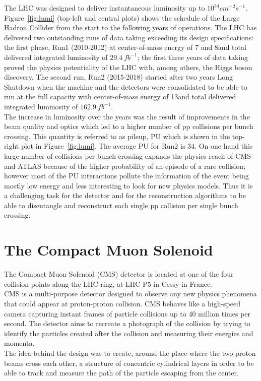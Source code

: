 The LHC was designed to deliver instantaneous luminosity up to $10^{34}cm^{-2}s^{-1}$.\\
Figure~\ref{fig:lumi} (top-left and central
plots) shows the schedule of the Large Hadron Collider from the start
to the following years of operations. The LHC has delivered two
outstanding runs of data taking exceeding its design specifications: the first phase, Run1 (2010-2012) at
center-of-mass energy of 7 and 8\TeV and total delivered integrated
luminosity of $29.4\ fb^{-1}$; the first three years of data taking proved
the physics potentiality of the LHC with, among others, the Higgs boson
discovery. The second run, Run2 (2015-2018) started after two years Long
Shutdown when the machine and the detectors were 
consolidated to be able to run at the full capacity with 
center-of-mass energy of 13\TeV and total delivered integrated
luminosity of $162.9\ fb^{-1}$.\\
The increase in luminosity over the
years was the result of improvements in the beam quality and optics which
led to a higher number of pp collisions per bunch crossing. This
quantity is referred to as pileup, PU which is shown in the top-right plot
in Figure~\ref{fig:lumi}. The average \textlangle{}PU\textrangle{} for
Run2 is 34. On one hand this large
number of collisions per bunch crossing 
expands the physics reach of CMS and ATLAS because of
the higher probability of an episode of a rare collision; however
most of the PU interactions pollute the information of the
event being mostly low energy and less interesting to look for
new physics models. Thus it is a challenging task for the detector and for
the reconstruction algorithms to be able 
to disentangle and reconstruct each single pp collision per single
bunch crossing.

\section{The Compact Muon Solenoid}\label{cms}

The Compact Muon Solenoid (CMS) detector is located at one of the four
collision points along the LHC ring, at LHC P5 in Cessy in
France.  \\
CMS is a multi-purpose detector designed to observe any new physics
phenomena that could appear at proton-proton collision. CMS behaves
like a high-speed camera capturing instant frames of particle
collisions up to 40 million times per second. The detector aims to recreate a
photograph of the collision by trying to
identify the particles created after the collision and
measuring their energies and momenta. \\
The idea behind the design was to create, around the place where the
two proton beams cross each other, a structure of concentric cylindrical layers
in order to be able to track and measure the path of the particle
escaping from the center.   

